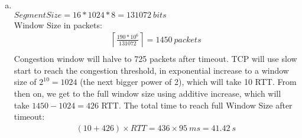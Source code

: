 \documentclass[11pt]{article}
\begin{document}
\begin{enumerate}[1.]
\begin{enumerate}[(a)]
 	\item \textbf{ 
  }\\
  $Segment Size = 16 * 1024 * 8 = 131072\ bits$ \\
  Window Size in packets: 
  \begin{align*}
    \left\lceil\frac{190*10^6}{131072}\right\rceil = 1450\ packets\\
  \end{align*} 
  Congestion window will halve to 725 packets after timeout. TCP will use slow start to reach  the congestion threshold, in exponential increase to a window size of $2^{10} = 1024$ (the next bigger power of 2), which will take 10 RTT. From then on, we get to the full window size using additive increase, which will take $1450 - 1024 = 426$ RTT. The total time to reach full Window Size after timeout: 
  \begin{align*}
    (10 + 426) \times RTT = 436 \times 95\ ms = 41.42\ s
  \end{align*}
 	\end{enumerate}
\end{enumerate}
\end{document}
